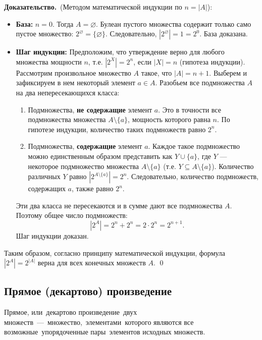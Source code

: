 \documentclass[a4paper,12pt]{article}
\newcommand{\myproof}{\textbf{Доказательство.}\ }
\begin{document}
\myproof (Методом математической индукции по $n = |A|$):
\begin{itemize}
	\item \textbf{База:} $n=0$. Тогда $A = \varnothing$. Булеан пустого множества содержит только само пустое множество: $2^\varnothing = \{\varnothing\}$. Следовательно, $|2^\varnothing| = 1 = 2^0$. База доказана.
	\item \textbf{Шаг индукции:} Предположим, что утверждение верно для любого множества мощности $n$, т.е. $|2^X| = 2^n$, если $|X| = n$ (гипотеза индукции).
	Рассмотрим произвольное множество $A$ такое, что $|A| = n+1$. Выберем и зафиксируем в нем некоторый элемент $a \in A$.
	Разобьем все подмножества $A$ на два непересекающихся класса:
	\begin{enumerate}
		\item Подмножества, \textbf{не содержащие} элемент $a$. Это в точности все подмножества множества $A \setminus \{a\}$, мощность которого равна $n$. По гипотезе индукции, количество таких подмножеств равно $2^n$.
		\item Подмножества, \textbf{содержащие} элемент $a$. Каждое такое подмножество можно единственным образом представить как $Y \cup \{a\}$, где $Y$ — некоторое подмножество множества $A \setminus \{a\}$ (т.е. $Y \subseteq A \setminus \{a\}$). Количество различных $Y$ равно $|2^{A \setminus \{a\}}| = 2^n$. Следовательно, количество подмножеств, содержащих $a$, также равно $2^n$.
	\end{enumerate}
	Эти два класса не пересекаются и в сумме дают все подмножества $A$. Поэтому общее число подмножеств:
	\[ |2^A| = 2^n + 2^n = 2 \cdot 2^n = 2^{n+1}. \]
	Шаг индукции доказан.
\end{itemize}
Таким образом, согласно принципу математической индукции, формула $|2^A| = 2^{|A|}$ верна для всех конечных множеств $A$. \qed

\subsection{Прямое (декартово) произведение}

Прямое, или декартово произведение двух множеств — множество, элементами которого являются все возможные упорядоченные пары элементов исходных множеств.
\end{document}
